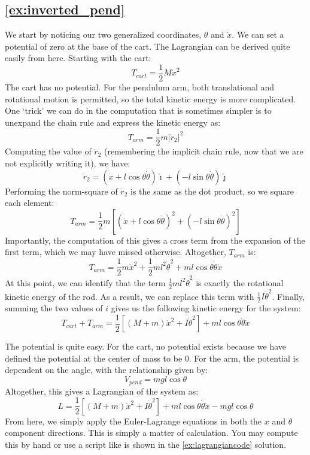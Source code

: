 \documentclass[10pt, openany, titlepage]{book}
\theoremstyle{definition}
\let\oldautoref\autoref
\renewcommand{\autoref}[1]{%
  \begingroup
  \hypersetup{linkcolor=black}%
  \oldautoref{#1}%
  \endgroup
}
\begin{document}
\subsection*{\texorpdfstring{\autoref{ex:inverted_pend}}{Inverted Pendulum}}
We start by noticing our two \glspl{generalized coordinate}, $\theta$ and $\dot{x}$. We can set a potential of zero at the base of the cart. The \gls{Lagrangian} can be derived quite easily from here. Starting with the cart:
$$T_{cart}=\frac{1}{2}M\dot{x}^2$$
The cart has no potential. For the pendulum arm, both translational and rotational motion is permitted, so the total kinetic energy is more complicated. One `trick' we can do in the computation that is sometimes simpler is to unexpand the chain rule and express the kinetic energy as:
$$T_{arm}=\frac{1}{2}m|\dot{r}_2|^2$$
Computing the value of $\dot{r}_2$ (remembering the implicit chain rule, now that we are not explicitly writing it), we have:
$$\dot{r}_2=(\dot{x}+l\cos\theta\dot{\theta})\hat{\imath}+(-l\sin\theta\dot{\theta})\hat{\jmath}$$
Performing the norm-square of $\dot{r}_2$ is the same as the dot product, so we square each element:
$$T_{arm}=\frac{1}{2}m\left[(\dot{x}+l\cos\theta\dot{\theta})^2+(-l\sin\theta\dot{\theta})^2\right]$$
Importantly, the computation of this gives a cross term from the expansion of the first term, which we may have missed otherwise. Altogether, $T_{arm}$ is:
$$T_{arm}=\frac{1}{2}m\dot{x}^2+\frac{1}{2}ml^2\dot{\theta}^2+ml\cos\theta\dot\theta\dot{x}$$
At this point, we can identify that the term $\frac{1}{2}ml^2\dot{\theta}^2$ is exactly the rotational kinetic energy of the rod. As a result, we can replace this term with $\frac{1}{2}I\dot{\theta}^2$. Finally, summing the two values of $i$ gives us the following kinetic energy for the system:
$$T_{cart}+T_{arm}=\frac{1}{2}\left[\left(M+m\right)\dot{x}^2+I\dot{\theta}^2\right]+ml\cos\theta\dot{\theta}\dot{x}$$

The potential is quite easy. For the cart, no potential exists because we have defined the potential at the center of mass to be $0$. For the arm, the potential is dependent on the angle, with the relationship given by:
$$V_{pend}=mgl\cos{\theta}$$
Altogether, this gives a \gls{Lagrangian} of the system as:
$$L=\frac{1}{2}\left[\left(M+m\right)\dot{x}^2+I\dot{\theta}^2\right]+ml\cos\theta\dot{\theta}\dot{x}-mgl\cos{\theta}$$
From here, we simply apply the Euler-Lagrange equations in both the $x$ and $\theta$ component directions. This is simply a matter of calculation. You may compute this by hand or use a script like is shown in the \autoref{ex:lagrangiancode} solution.
\end{document}
